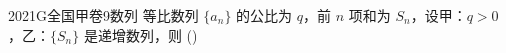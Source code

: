 
\begin{problem}{2021}{G}{全国甲卷}{9}{数列}
等比数列 $\{a_n\}$ 的公比为 $q$，前 $n$ 项和为 $S_n$，设甲：$q>0$，乙：$\{S_n\}$ 是递增数列，则
(\hspace{1cm})
\begin{choices}
\end{choices}
\end{problem}